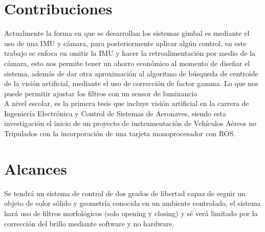 \section{Contribuciones}
Actualmente la forma en que se desarrollan los sistemas gimbal es mediante el uso de una IMU y cámara, para posteriormente aplicar algún control, en este trabajo se enfoca en omitir
la IMU y hacer la retroalimentación por medio de la cámara, esto nos permite tener un ahorro económico al momento de diseñar el sistema, además de dar otra aproximación al
algoritmo de búsqueda de centroide de la visión artificial, mediante el uso de corrección de factor gamma. Lo que nos puede permitir ajustar los filtros con un sensor de luminancia\\
A nivel escolar, es la primera tesis que incluye visión artificial en la carrera de Ingeniería Electrónica y Control de Sistemas de Aeronaves,
siendo esta investigación el inicio de un proyecto de instrumentación de Vehículos Aéreos no Tripulados con la incorporación de una tarjeta monoprocesador con ROS.

\section{Alcances}
Se tendrá un sistema de control de dos grados de libertad capaz de seguir un objeto de color sólido y geometría conocida en un ambiente controlado, el sistema hará uso
de filtros morfológicos (solo opening y closing) y sé verá limitado por la corrección del brillo mediante software y no hardware.
